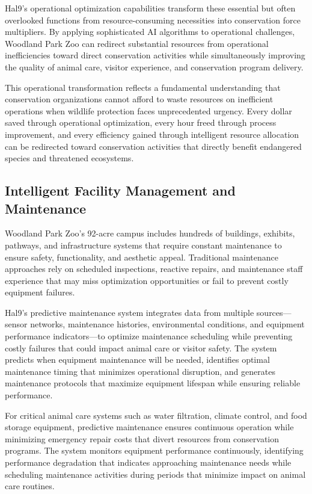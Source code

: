 \documentclass[
  Letterpaper,
]{scrbook}
\begin{document}
Hal9's operational optimization capabilities transform these essential
but often overlooked functions from resource-consuming necessities into
conservation force multipliers. By applying sophisticated AI algorithms
to operational challenges, Woodland Park Zoo can redirect substantial
resources from operational inefficiencies toward direct conservation
activities while simultaneously improving the quality of animal care,
visitor experience, and conservation program delivery.

This operational transformation reflects a fundamental understanding
that conservation organizations cannot afford to waste resources on
inefficient operations when wildlife protection faces unprecedented
urgency. Every dollar saved through operational optimization, every hour
freed through process improvement, and every efficiency gained through
intelligent resource allocation can be redirected toward conservation
activities that directly benefit endangered species and threatened
ecosystems.

\subsection{Intelligent Facility Management and
Maintenance}\label{intelligent-facility-management-and-maintenance}

Woodland Park Zoo's 92-acre campus includes hundreds of buildings,
exhibits, pathways, and infrastructure systems that require constant
maintenance to ensure safety, functionality, and aesthetic appeal.
Traditional maintenance approaches rely on scheduled inspections,
reactive repairs, and maintenance staff experience that may miss
optimization opportunities or fail to prevent costly equipment failures.

Hal9's predictive maintenance system integrates data from multiple
sources---sensor networks, maintenance histories, environmental
conditions, and equipment performance indicators---to optimize
maintenance scheduling while preventing costly failures that could
impact animal care or visitor safety. The system predicts when equipment
maintenance will be needed, identifies optimal maintenance timing that
minimizes operational disruption, and generates maintenance protocols
that maximize equipment lifespan while ensuring reliable performance.

For critical animal care systems such as water filtration, climate
control, and food storage equipment, predictive maintenance ensures
continuous operation while minimizing emergency repair costs that divert
resources from conservation programs. The system monitors equipment
performance continuously, identifying performance degradation that
indicates approaching maintenance needs while scheduling maintenance
activities during periods that minimize impact on animal care routines.
\end{document}
